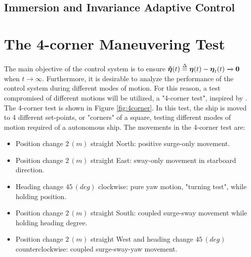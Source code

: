 




\subsection{Immersion and Invariance Adaptive Control}


\section{The 4-corner Maneuvering Test}

The main objective of the control system is to ensure $\boldsymbol{\Tilde{\eta}}(t) \stackrel{\Delta}{=} \boldsymbol{\eta}(t)-\boldsymbol{\eta}_t(t) \xrightarrow{} \boldsymbol{0}$ when $t \rightarrow{} \infty$. Furthermore, it is desirable to analyze the performance of the control system during different modes of motion. For this reason, a test compromised of different motions will be utilized, a "4-corner test", inspired by \cite{Skjetne2017}. The 4-corner test is shown in Figure \ref{fig:4corner}. In this test, the ship is moved to 4 different set-points, or "corners" of a square, testing different modes of motion required of a autonomous ship. The movements in the 4-corner test are:
\begin{itemize}
    \item Position change $2\, (m)$ straight North: positive surge-only movement.
    \item Position change $2\, (m)$ straight East:  sway-only movement in starboard direction.
    \item Heading change $45\, (deg)$ clockwise:  pure yaw motion, "turning test", while holding position.
    \item Position change $2\, (m)$ straight South:  coupled surge-sway movement while holding heading degree. 
    \item Position change $2\, (m)$ straight West and heading change $45\, (deg)$ counterclockwise: coupled surge-sway-yaw movement.
\end{itemize}

